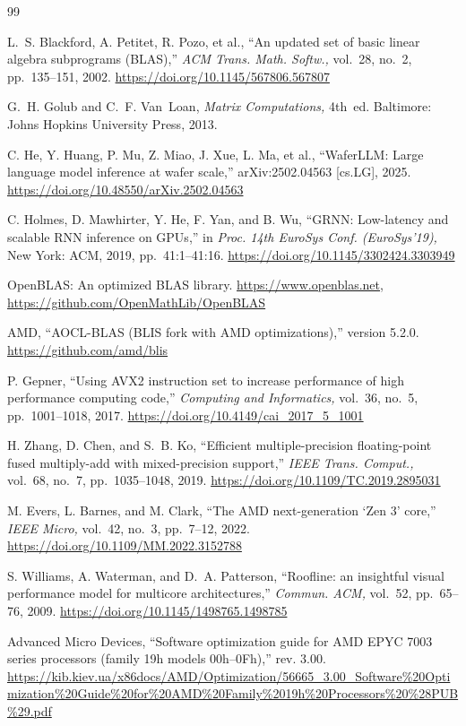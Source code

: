 \documentclass[conference]{IEEEtran}
\begin{document}
\begin{thebibliography}{99}

L.~S. Blackford, A. Petitet, R. Pozo, et al.,
``An updated set of basic linear algebra subprograms (BLAS),''
\textit{ACM Trans. Math. Softw.,} vol.~28, no.~2, pp.~135--151, 2002.
\url{https://doi.org/10.1145/567806.567807}

G.~H. Golub and C.~F. Van~Loan,
\textit{Matrix Computations,} 4th~ed.
Baltimore: Johns Hopkins University Press, 2013.

C. He, Y. Huang, P. Mu, Z. Miao, J. Xue, L. Ma, et al.,
``WaferLLM: Large language model inference at wafer scale,''
arXiv:2502.04563 [cs.LG], 2025.
\url{https://doi.org/10.48550/arXiv.2502.04563}

C. Holmes, D. Mawhirter, Y. He, F. Yan, and B. Wu,
``GRNN: Low-latency and scalable RNN inference on GPUs,''
in \textit{Proc. 14th EuroSys Conf. (EuroSys'19),}
New York: ACM, 2019, pp.~41:1--41:16.
\url{https://doi.org/10.1145/3302424.3303949}

OpenBLAS: An optimized BLAS library.
\url{https://www.openblas.net},
\url{https://github.com/OpenMathLib/OpenBLAS}

AMD, ``AOCL-BLAS (BLIS fork with AMD optimizations),'' version 5.2.0.
\url{https://github.com/amd/blis}

P. Gepner,
``Using AVX2 instruction set to increase performance of high performance computing code,''
\textit{Computing and Informatics,} vol.~36, no.~5, pp.~1001--1018, 2017.
\url{https://doi.org/10.4149/cai_2017_5_1001}

H. Zhang, D. Chen, and S.~B. Ko,
``Efficient multiple-precision floating-point fused multiply-add with mixed-precision support,''
\textit{IEEE Trans. Comput.,} vol.~68, no.~7, pp.~1035--1048, 2019.
\url{https://doi.org/10.1109/TC.2019.2895031}

M. Evers, L. Barnes, and M. Clark,
``The AMD next-generation `Zen 3' core,''
\textit{IEEE Micro,} vol.~42, no.~3, pp.~7--12, 2022.
\url{https://doi.org/10.1109/MM.2022.3152788}

S. Williams, A. Waterman, and D.~A. Patterson,
``Roofline: an insightful visual performance model for multicore architectures,''
\textit{Commun. ACM,} vol.~52, pp.~65--76, 2009.
\url{https://doi.org/10.1145/1498765.1498785}

Advanced Micro Devices,
``Software optimization guide for AMD EPYC 7003 series processors
(family 19h models 00h--0Fh),'' rev. 3.00.
\url{https://kib.kiev.ua/x86docs/AMD/Optimization/56665_3.00_Software\%20Optimization\%20Guide\%20for\%20AMD\%20Family\%2019h\%20Processors\%20\%28PUB\%29.pdf}


\end{thebibliography}
\end{document}
